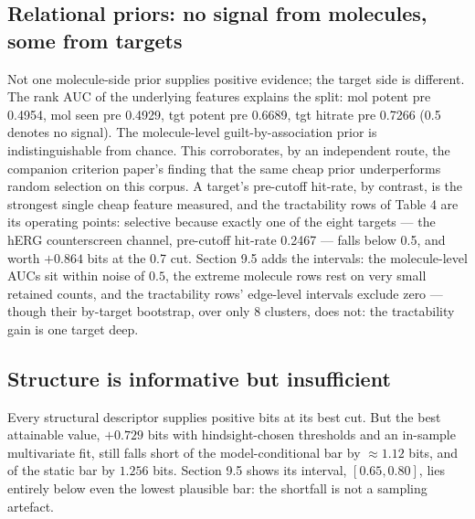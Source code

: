 \documentclass[11pt]{article}
\begin{document}
\subsection{Relational priors: no signal from molecules, some from targets}

Not one molecule-side prior supplies positive evidence; the target side is
different. The rank AUC of the underlying features explains the split: mol
potent pre 0.4954, mol seen pre 0.4929, tgt potent pre
0.6689, tgt hitrate pre 0.7266 (0.5 denotes no signal). The
molecule-level guilt-by-association prior is indistinguishable from
chance. This corroborates, by an independent route, the companion
criterion paper's \cite{ghosh-criterion} finding that the same cheap
prior underperforms random selection on this corpus. A target's
pre-cutoff hit-rate, by contrast, is the strongest single cheap feature
measured, and the tractability rows of Table 4 are its operating points:
selective because exactly one of the eight targets --- the hERG
counterscreen channel, pre-cutoff hit-rate 0.2467 --- falls below 0.5,
and worth $+0.864$ bits at the 0.7 cut. Section 9.5 adds the
intervals: the molecule-level AUCs sit within noise of $0.5$, the
extreme molecule rows rest on very small retained counts, and the
tractability rows' edge-level intervals exclude zero --- though their
by-target bootstrap, over only 8 clusters, does not: the tractability
gain is one target deep.

\subsection{Structure is informative but insufficient}

Every structural descriptor supplies positive bits at its best cut. But
the best attainable value, $+0.729$ bits with hindsight-chosen
thresholds and an in-sample multivariate fit, still falls short of the
model-conditional bar by $\approx 1.12$ bits, and of the static bar by
$1.256$ bits. Section 9.5 shows its interval, $[0.65, 0.80]$, lies entirely
below even the lowest plausible bar: the shortfall is not a sampling artefact.
\end{document}

